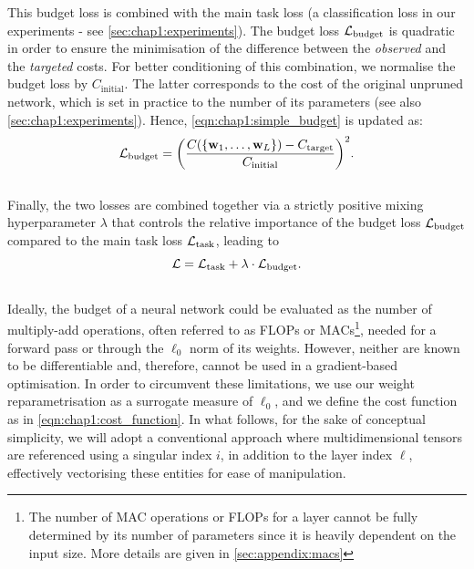 \noindent This budget loss is combined with the main task loss (a classification
loss in our experiments - see \cref{sec:chap1:experiments}). The budget loss $
  {\cal L}_\text{budget}$ is quadratic in order to ensure the minimisation of the
difference between the {\em observed} and the {\em targeted} costs. For better
conditioning of this combination, we normalise the budget loss by
$C_\text{initial}$. The latter corresponds to the cost of the original unpruned
network, which is set in practice to the number of its parameters (see also
\cref{sec:chap1:experiments}). Hence, \cref{eqn:chap1:simple_budget} is updated
as:\\

\begin{equation}
  \label{eqn:chap1:real_budget}
  {\cal L}_\text{budget} = \biggl( \displaystyle\frac{C(\{\mathbf{w}_1,\dots, \mathbf{w}_L\}) - C_\text{target}}{C_\text{initial}} \biggr)^2.
\end{equation}\\

Finally, the two losses are combined together via a strictly positive mixing
hyperparameter $\lambda$ that controls the relative importance of the budget loss
${\cal L}_\text{budget}$ compared to the main task loss ${\cal L}_\text{task}$,
leading to\\

\begin{equation}
  \label{eqn:chap1:globalloss}
  {\cal L} =  {\cal L}_\text{task} + \lambda \cdot {\cal L}_\text{budget}.
\end{equation} \\

Ideally, the budget of a neural network could be evaluated as the number of
multiply-add operations, often referred to as \acp{FLOP} or
\acp{MAC}\footnote{The number of \ac{MAC} operations  or \acp{FLOP} for a layer
  cannot be fully determined by its number of parameters since it is heavily
  dependent on the input size. More details are given in
  \cref{sec:appendix:macs}}, needed for a forward pass or through the $\ell_0$
norm of its weights. However, neither are known to be differentiable and,
therefore, cannot be used in a gradient-based optimisation. In order to
circumvent these limitations, we use our weight reparametrisation as a surrogate
measure of $\ell_0$, and we define the cost function as in
\cref{eqn:chap1:cost_function}. In what follows, for the sake of conceptual
simplicity, we will adopt a conventional approach where multidimensional tensors
are referenced using a singular index $i$, in addition to the layer index
$\ell$, effectively vectorising these entities for ease of manipulation. \\

